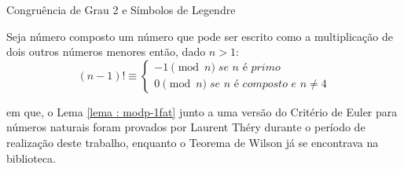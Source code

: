 \begin{frame}[fragile]{Congruência de Grau 2 e Símbolos de Legendre}



    \begin{teorema} \label{teorema : wilson}
        Seja número composto um número que pode ser escrito como a multiplicação de dois outros números menores então, dado $n > 1$:
        \begin{equation*}
            (n - 1)! \equiv \begin{cases}
                            -1 \pmod{n} \; \textit{se $n$ é primo} \\
                            0 \pmod{n} \; \textit{se $n$ é composto e $n \neq 4$}
                            \end{cases}
        \end{equation*}
    \end{teorema}
        
    em que, o Lema \ref{lema : modp-1fat} junto a uma versão do Critério de Euler para números naturais foram provados por Laurent Théry durante o período de realização deste trabalho, enquanto o Teorema de Wilson já se encontrava na biblioteca.

\end{frame}

